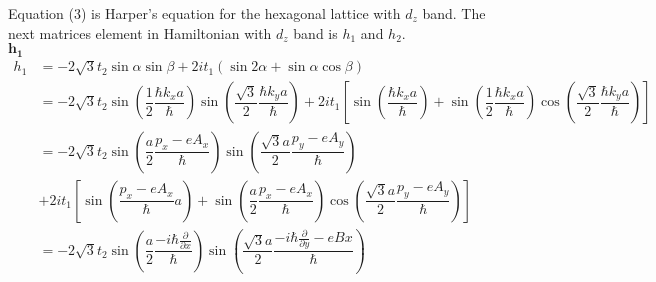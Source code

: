 \documentclass{report}
\newcommand{\f}[2]{\dfrac{#1}{#2}}
\begin{document}
Equation (3) is Harper's equation for the hexagonal lattice with $d_z$ band.
\newpage
The next matrices element in Hamiltonian with $d_z$ band is $h_{1}$ and $h_{2}$.\\
$\mathbf{h_{1}}$
\begin{align*}
	h_{1}
	 & = -2\sqrt{3} t_2 \sin\alpha \sin\beta + 2i t_1(\sin2\alpha + \sin\alpha \cos\beta)                                                                                                                                                                                                                                                                                                                                                                         \\
	 & = -2\sqrt{3} t_2 \sin(\f{1}{2}\f{\hbar k_x a}{\hbar}) \sin(\f{\sqrt{3}}{2}\f{\hbar k_y a}{\hbar}) + 2i t_1\left[\sin(\f{\hbar k_x a}{\hbar}) + \sin(\f{1}{2}\f{\hbar k_x a}{\hbar}) \cos(\f{\sqrt{3}}{2}\f{\hbar k_y a}{\hbar})\right]                                                                                                                                                                                                                     \\
	 & = -2\sqrt{3} t_2 \sin(\f{a}{2}\f{p_x - eA_x}{\hbar}) \sin(\f{\sqrt{3}a}{2}\f{p_y - eA_y}{\hbar})                                                                                                                                                                                                                                                                                                                                                           \\
	 & + 2i t_1\left[\sin(\f{p_x - eA_x}{\hbar}a) + \sin(\f{a}{2}\f{p_x - eA_x}{\hbar}) \cos(\f{\sqrt{3}a}{2}\f{p_y - eA_y}{\hbar})\right]                                                                                                                                                                                                                                                                                                                        \\
	 & = -2\sqrt{3} t_2 \sin(\f{a}{2}\f{-i\hbar \frac{\partial}{\partial x}}{\hbar}) \sin(\f{\sqrt{3}a}{2}\f{-i\hbar \frac{\partial}{\partial y} - eBx}{\hbar})                                                                                                                                                                                                                                                                                                   \\

\end{align*}
\end{document}
